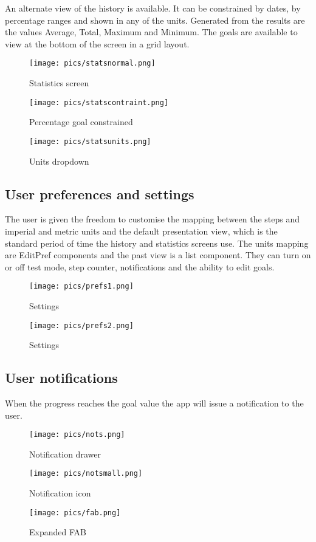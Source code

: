 \documentclass[12pt]{report}
\begin{document}
An alternate view of the history is available. It can be constrained by dates, by percentage ranges and shown in any of the units. Generated from the results are the values Average, Total, Maximum and Minimum. The goals are available to view at the bottom of the screen in a grid layout. 

\begin{figure}[!htb]
  \texttt{[image: pics/statsnormal.png]}
  \caption{Statistics screen}
  \label{fig:statsnormal}
\endminipage\hfill
{}
  \texttt{[image: pics/statscontraint.png]}
  \caption{Percentage goal constrained}\label{fig:statscontraint}
\endminipage\hfill
{}%
  \texttt{[image: pics/statsunits.png]}
  \caption{Units dropdown}\label{fig:statsunits}
\endminipage
\end{figure}

\subsection{User preferences and settings}

The user is given the freedom to customise the mapping between the steps and imperial and metric units and the default presentation view, which is the standard period of time the history and statistics screens use. The units mapping are EditPref components and the past view is a list component.  They can turn on or off test mode, step counter, notifications and the ability to edit goals. 

\begin{figure}[!htb]
  \texttt{[image: pics/prefs1.png]}
  \caption{Settings}
  \label{fig:prefs1}
\endminipage\hfill
{}
  \texttt{[image: pics/prefs2.png]}
  \caption{Settings}\label{fig:prefs2}
\endminipage
\end{figure}

\subsection{User notifications}

When the progress reaches the goal value the app will issue a notification to the user. 

\begin{figure}[!htb]
  \texttt{[image: pics/nots.png]}
  \caption{Notification drawer}
  \label{fig:prefs1}
\endminipage\hfill
{}
  \texttt{[image: pics/notsmall.png]}
  \caption{Notification icon}\label{fig:prefs2}
\endminipage\hfill
{}
  \texttt{[image: pics/fab.png]}
  \caption{Expanded FAB}\label{fig:fab}
\endminipage
\end{figure}
\end{document}
